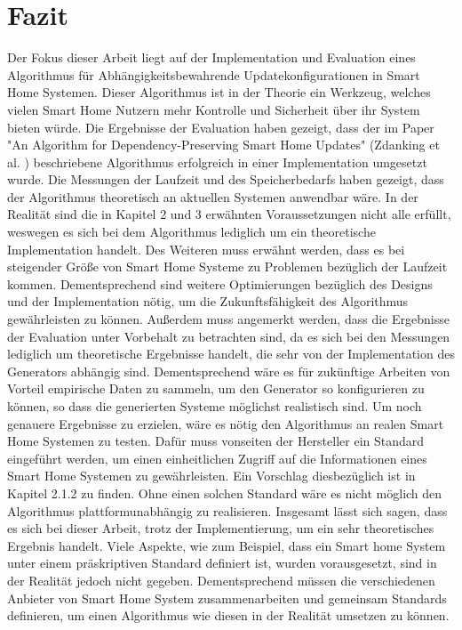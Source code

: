 \chapter{Fazit}
Der Fokus dieser Arbeit liegt auf der Implementation und Evaluation eines Algorithmus für Abhängigkeitsbewahrende
Updatekonfigurationen in Smart Home Systemen. Dieser Algorithmus ist in der Theorie ein Werkzeug, welches vielen Smart
Home Nutzern mehr Kontrolle und Sicherheit über ihr System bieten würde.
Die Ergebnisse der Evaluation haben gezeigt, dass der im Paper "An Algorithm for Dependency-Preserving Smart Home Updates" (Zdanking et al. )
beschriebene Algorithmus erfolgreich in einer Implementation umgesetzt wurde. Die Messungen der Laufzeit und des Speicherbedarfs haben
gezeigt, dass der Algorithmus theoretisch an aktuellen Systemen anwendbar wäre. In der Realität sind die in Kapitel 2 und 3 erwähnten Voraussetzungen
nicht alle erfüllt, weswegen es sich bei dem Algorithmus lediglich um ein theoretische Implementation handelt.
Des Weiteren muss erwähnt werden, dass es bei steigender Größe von Smart Home Systeme
zu 
Problemen bezüglich der Laufzeit kommen. Dementsprechend sind weitere Optimierungen bezüglich des Designs
und der Implementation nötig, um die Zukunftsfähigkeit des Algorithmus gewährleisten zu können.
Außerdem muss angemerkt werden, dass die Ergebnisse der Evaluation unter
Vorbehalt zu betrachten sind, da es sich bei den Messungen lediglich um theoretische Ergebnisse handelt, die sehr von der
Implementation des Generators abhängig sind. Dementsprechend wäre es für zukünftige Arbeiten von Vorteil empirische Daten
zu sammeln, um den Generator so konfigurieren zu können, so dass die generierten Systeme möglichst realistisch sind. Um noch
genauere Ergebnisse zu erzielen, wäre es nötig den Algorithmus an realen Smart Home Systemen zu testen. Dafür muss vonseiten
der Hersteller ein Standard eingeführt werden, um einen einheitlichen Zugriff auf die Informationen eines Smart Home Systemen zu
gewährleisten. Ein Vorschlag diesbezüglich ist in Kapitel 2.1.2 zu finden. Ohne einen solchen Standard wäre es nicht möglich den Algorithmus
plattformunabhängig zu realisieren.
Insgesamt lässt sich sagen, dass es sich bei dieser Arbeit, trotz der Implementierung, um ein sehr theoretisches Ergebnis handelt. Viele Aspekte,
wie zum Beispiel, dass ein Smart home System unter einem präskriptiven Standard definiert ist, wurden vorausgesetzt, sind in der Realität jedoch
nicht gegeben. Dementsprechend
müssen die verschiedenen Anbieter von Smart Home System zusammenarbeiten und gemeinsam Standards definieren, um einen Algorithmus
wie diesen in der Realität umsetzen zu können.




